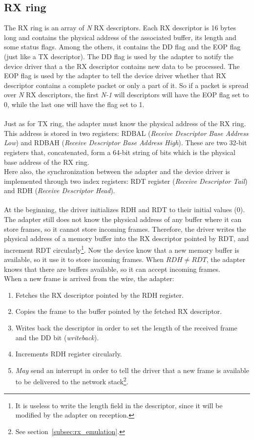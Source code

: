 \documentclass[a4paper, 12pt, titlepage]{report}
\begin{document}
\subsection{RX ring}
The RX ring is an array of \textit{N} RX descriptors. Each RX descriptor is 16 bytes long and contains the physical address of the associated buffer, its length and some status flags. Among the others, it contains the DD flag and the EOP flag (just like a TX descriptor). The DD flag is used by the adapter to notify the device driver that a the RX descriptor contains new data to be processed. The EOP flag is used by the adapter to tell the device driver whether that RX descriptor contains a complete packet or only a part of it. So if a packet is spread over \textit{N} RX descriptors, the first \textit{N-1} will descriptors will have the EOP flag set to 0, while the last one will have the flag set to 1.
\\
\\
Just as for TX ring, the adapter must know the physical address of the RX ring. This address is stored in two registers: RDBAL (\textit{Receive Descriptor Base Address Low}) and RDBAH (\textit{Receive Descriptor Base Address High}). These are two 32-bit registers that, concatenated, form a 64-bit string of bits which is the physical base address of the RX ring.
\\
Here also, the synchronization between the adapter and the device driver is implemented through two index registers: RDT register (\textit{Receive Descriptor Tail}) and RDH (\textit{Receive Descriptor Head}).
\\
\\
At the beginning, the driver initializes RDH and RDT to their initial values (0). The adapter still does not know the physical address of any buffer where it can store frames, so it cannot store incoming frames. Therefore, the driver writes the physical address of a memory buffer into the RX descriptor pointed by RDT, and increment RDT circularly\footnote{It is useless to write the length field in the descriptor, since it will be modified by the adapter on reception.}. Now the device know that a new memory buffer is available, so it use it to store incoming frames. When $RDH \neq RDT$, the adapter knows that there are buffers available, so it can accept incoming frames.
\\
When a new frame is arrived from the wire, the adapter:
\begin{enumerate}
\item Fetches the RX descriptor pointed by the RDH register.
\item Copies the frame to the buffer pointed by the fetched RX descriptor.
\item Writes back the descriptor in order to set the length of the received frame and the DD bit (\textit{writeback}).
\item Increments RDH register circularly.
\item \textit{May} send an interrupt in order to tell the driver that a new frame is available to be delivered to the network stack\footnote{See section~\ref{subsec:rx_emulation}.}.
\end{enumerate}
\end{document}
